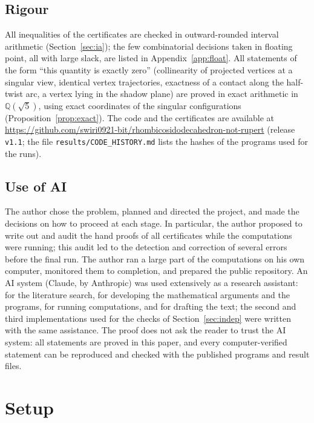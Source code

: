 \documentclass[11pt]{amsart}
\theoremstyle{definition}
\newcommand{\Q}{\mathbb{Q}}
\newcommand{\sq}{\sqrt5}
\begin{document}
\subsection*{Rigour}
All inequalities of the certificates are checked in outward-rounded interval arithmetic (Section~\ref{sec:ia}); the few
combinatorial decisions taken in floating point, all with large slack, are listed in Appendix~\ref{app:float}. All
statements of the form ``this quantity is exactly zero'' (collinearity of projected vertices at a singular view,
identical vertex trajectories, exactness of a contact along the half-twist arc, a vertex lying in the shadow plane)
are proved in exact arithmetic in $\Q(\sq)$, using exact coordinates of the singular configurations
(Proposition~\ref{prop:exact}). The code and the certificates are available at \url{https://github.com/swiri0921-bit/rhombicosidodecahedron-not-rupert}
(release \texttt{v1.1}; the file \texttt{results/CODE\_HISTORY.md} lists the hashes of the programs used for the runs).

\subsection*{Use of AI}
The author chose the problem, planned and directed the project, and made the decisions on how to proceed at each
stage. In particular, the author proposed to write out and audit the hand proofs of all certificates while the
computations were running; this audit led to the detection and correction of several errors before the final run.
The author ran a large part of the computations on his own computer, monitored them to completion, and prepared the
public repository. An AI system (Claude, by Anthropic) was used extensively as a research assistant: for the
literature search, for developing the mathematical arguments and the programs, for running computations, and for
drafting the text; the second and third implementations used for the checks of Section~\ref{sec:indep} were written with the same
assistance. The proof does not ask the reader to trust the AI system: all statements are proved in this paper, and
every computer-verified statement can be reproduced and checked with the published programs and result files.

\section{Setup}\label{sec:setup}
\end{document}
